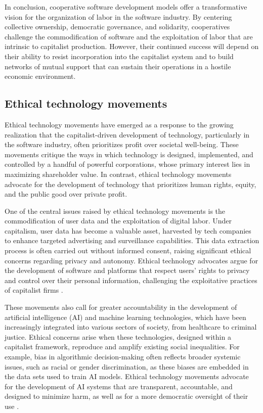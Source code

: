\begin{refsection}
In conclusion, cooperative software development models offer a transformative vision for the organization of labor in the software industry. By centering collective ownership, democratic governance, and solidarity, cooperatives challenge the commodification of software and the exploitation of labor that are intrinsic to capitalist production. However, their continued success will depend on their ability to resist incorporation into the capitalist system and to build networks of mutual support that can sustain their operations in a hostile economic environment.

\subsection{Ethical technology movements}

Ethical technology movements have emerged as a response to the growing realization that the capitalist-driven development of technology, particularly in the software industry, often prioritizes profit over societal well-being. These movements critique the ways in which technology is designed, implemented, and controlled by a handful of powerful corporations, whose primary interest lies in maximizing shareholder value. In contrast, ethical technology movements advocate for the development of technology that prioritizes human rights, equity, and the public good over private profit.

One of the central issues raised by ethical technology movements is the commodification of user data and the exploitation of digital labor. Under capitalism, user data has become a valuable asset, harvested by tech companies to enhance targeted advertising and surveillance capabilities. This data extraction process is often carried out without informed consent, raising significant ethical concerns regarding privacy and autonomy. Ethical technology advocates argue for the development of software and platforms that respect users' rights to privacy and control over their personal information, challenging the exploitative practices of capitalist firms \cite[pp.~112-114]{zuboff2019}.

These movements also call for greater accountability in the development of artificial intelligence (AI) and machine learning technologies, which have been increasingly integrated into various sectors of society, from healthcare to criminal justice. Ethical concerns arise when these technologies, designed within a capitalist framework, reproduce and amplify existing social inequalities. For example, bias in algorithmic decision-making often reflects broader systemic issues, such as racial or gender discrimination, as these biases are embedded in the data sets used to train AI models. Ethical technology movements advocate for the development of AI systems that are transparent, accountable, and designed to minimize harm, as well as for a more democratic oversight of their use \cite[pp.~153-155]{noble2018}.


\end{refsection}
